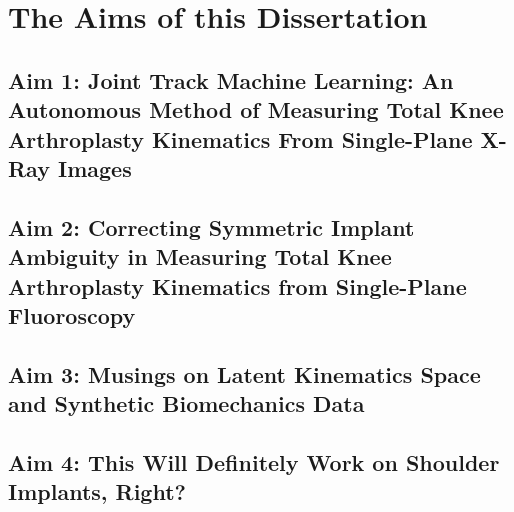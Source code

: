 \chapter{The Aims of this Dissertation}
\label{sec:aims}

\section{Aim 1: Joint Track Machine Learning: An Autonomous Method of Measuring Total Knee Arthroplasty Kinematics From Single-Plane X-Ray Images}
\label{sec:aim1}


\section{Aim 2: Correcting Symmetric Implant Ambiguity in Measuring Total Knee Arthroplasty Kinematics from Single-Plane Fluoroscopy}
\label{sec:aim2}


\section{Aim 3: Musings on Latent Kinematics Space and Synthetic Biomechanics Data}
\label{sec:aim3}


\section{Aim 4: This Will Definitely Work on Shoulder Implants, Right?}
\label{sec:aim4}




